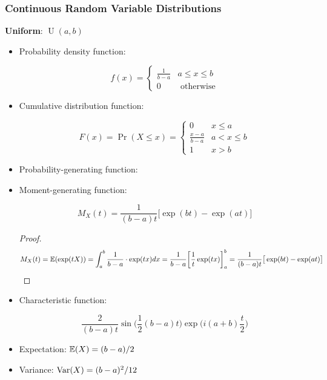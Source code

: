 \subsubsection{Continuous Random Variable Distributions}


\textbf{Uniform}: \(\operatorname{U}(a, b)\)

\begin{itemize}

\item Probability density function: 

\[
f(x) = \begin{cases}
\frac{1}{b-a} & a \leq x \leq b \\
0 & \text{ otherwise}
\end{cases}
\]

\item Cumulative distribution function: 

\[
F(x) = \Pr(X \leq x) = \begin{cases}
0 & x \leq a \\
\frac{x-a}{b-a} & a < x \leq b \\
1 & x > b
\end{cases}
\]

\item Probability-generating function:

\item Moment-generating function: 

\[
M_X(t) = \frac{1}{(b-a)t} \big[ \exp(bt) - \exp(at) \big]
\]

\begin{proof}
\[
M_X(t) = \E(\exp(tX)) = \int_a^b \frac{1}{b-a} \cdot \exp(tx) dx = \frac{1}{b-a} \bigg[ \frac{1}{t} \exp(tx) \bigg]_a^b =  \frac{1}{(b-a)t} \big[ \exp(bt) - \exp(at) \big]
\]
\end{proof}

\item Characteristic function:

\[
\frac{2}{(b-a)t} \sin \bigg( \frac{1}{2} (b-a)t \bigg) \exp \bigg(i(a+b) \frac{t}{2} \bigg)
\]

%

\item Expectation: \(\E(X) = (b-a)/2\)

\item Variance: \(\Var(X) = (b - a)^2/12 \)

\end{itemize}

